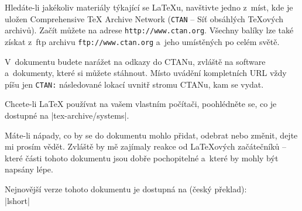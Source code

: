 \bigskip
\noindent Hledáte-li jakékoliv materiály týkající se \LaTeX u,
navštivte jedno z~míst, kde je uložen Comprehensive \TeX{}
Archive Network (\texttt{CTAN} -- Síť obsáhlých \TeX ových archivů).
Začít můžete na adrese \texttt{http://www.ctan.org}. Všechny balíky
lze také získat z~ftp archivu \texttt{ftp://www.ctan.org} a~jeho
 umístěných po celém světě.

V~dokumentu budete narážet na odkazy do CTANu, zvláště na software
a~dokumenty, které si můžete stáhnout. Místo uvádění kompletních
URL vždy píšu jen \texttt{CTAN:} následované lokací uvnitř stromu CTANu,
kam se vydat.

Chcete-li \LaTeX{} používat na vašem vlastním počítači, poohlédněte se,
co je dostupné na \CTANalt|tex-archive/systems|.

\noindent Máte-li nápady, co by se do dokumentu mohlo přidat, odebrat
nebo změnit, dejte mi prosím vědět. Zvláště by mě zajímaly reakce od
\LaTeX ových začátečníků -- které části tohoto dokumentu jsou dobře
pochopitelné a~které by mohly být napsány lépe.

\bigskip
\begin{verse}
%
\end{verse}
\noindent Nejnovější verze tohoto dokumentu je dostupná na (český překlad):\\
\CTAN|lshort|

\endinput



%

